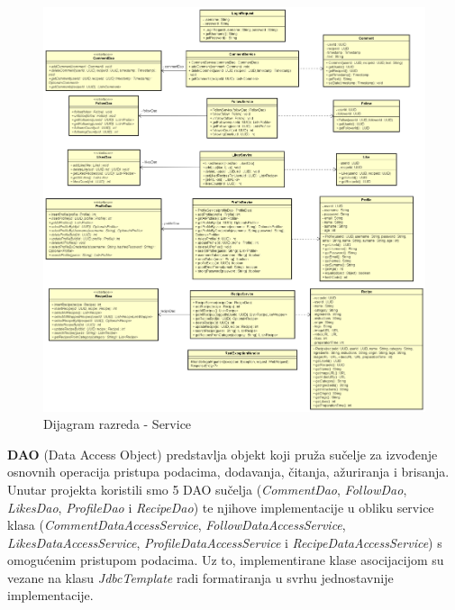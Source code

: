    \begin{figure}[H]
	\centering
	\includegraphics[width=1\linewidth]{slike/dijagrami/Service.png}
	\caption{Dijagram razreda - Service}
	\label{fig:enter-label}
\end{figure}
\eject
\noindent \textbf{DAO} (Data Access Object) predstavlja objekt koji pruža sučelje za izvođenje osnovnih operacija pristupa podacima, dodavanja, čitanja, ažuriranja i brisanja. Unutar projekta koristili smo 5 DAO sučelja (\textit{CommentDao}, \textit{FollowDao}, \textit{LikesDao}, \textit{ProfileDao} i \textit{RecipeDao}) te njihove implementacije u obliku service klasa (\textit{CommentDataAccessService}, \textit{FollowDataAccessService}, \textit{LikesDataAccessService}, \textit{ProfileDataAccessService} i \textit{RecipeDataAccessService}) s omogućenim pristupom podacima. Uz to, implementirane klase asocijacijom su vezane na klasu \textit{JdbcTemplate} radi formatiranja u svrhu jednostavnije implementacije.

